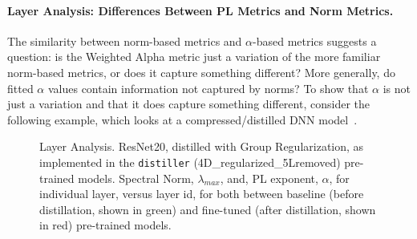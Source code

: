 \paragraph{Layer Analysis: Differences Between PL Metrics and Norm Metrics.}

The similarity between norm-based metrics and $\alpha$-based metrics suggests a question: is the Weighted Alpha metric just a variation of the more familiar norm-based metrics, or does it capture something different?  
More generally, do fitted $\alpha$ values contain information not captured by norms? 
To show that $\alpha$ is not just a variation and that it does capture something different, consider the following example, which looks at a compressed/distilled DNN model~\cite{CWZZ17_TR}.


\begin{figure}[t]
   \centering
   \caption{Layer Analysis.
            ResNet20, distilled with Group Regularization, as implemented in the \texttt{distiller} (4D\_regularized\_5Lremoved) pre-trained models.  
            Spectral Norm, $\lambda_{max}$, and, PL exponent, $\alpha$, for individual layer, versus layer id, for both between baseline (before distillation, shown in green) and fine-tuned (after distillation, shown in red) pre-trained models. 
           }
   \label{fig:resnet204D5L}
\end{figure}

